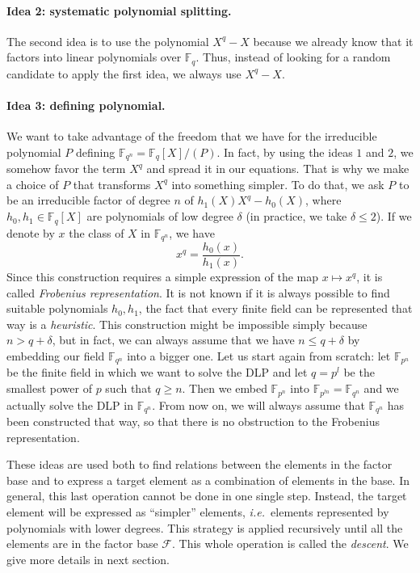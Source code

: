 \documentclass[a4paper,11pt]{article}
\theoremstyle{break}
\theoremstyle{sc}
\theoremstyle{definition}
\theoremstyle{remark}
\newcommand{\ie}{\emph{i.e.\ }}
\begin{document}
\paragraph{Idea 2: systematic polynomial splitting.} The second idea is to use
the polynomial $X^q-X$ because we already know that it factors into linear
polynomials over $\mathbb{F}_q$. Thus, instead of looking for a random candidate to
apply the first idea, we always use $X^q-X$.

\paragraph{Idea 3: defining polynomial.} We want to take advantage of the
freedom that we
have for the irreducible polynomial $P$ defining
$\mathbb{F}_{q^{n}}=\mathbb{F}_{q}[X]/(P)$. In fact, by using the ideas $1$ and
$2$, we somehow favor the term $X^q$ and spread it in our equations. That is why
we make a choice of $P$ that transforms $X^q$ into something simpler. To do
that, we ask $P$ to be an irreducible factor of degree $n$ of
$h_1(X)X^q-h_0(X)$,
where $h_0, h_1\in\mathbb{F}_{q}[X]$ are polynomials of low degree $\delta$
(in practice, we take $\delta\leq2$). If we
denote by $x$ the class of $X$ in $\mathbb{F}_{q^{n}}$, we have
\[
  x^q=\frac{h_0(x)}{h_1(x)}.
\]
Since this construction requires a simple expression of the map $x\mapsto x^q$, it
is called \emph{Frobenius representation}. It is not known if it is always
possible to find suitable polynomials $h_0, h_1$, the fact that every finite
field can be represented that way is a \emph{heuristic}. This construction
might be impossible simply because $n > q+\delta$, but in fact, we can always
assume that we have $n\leq q+\delta$ by embedding our field
$\mathbb{F}_{q^n}$ into a bigger
one. Let us start again from scratch: let $\mathbb{F}_{p^n}$ be the finite field
in which we want to solve the DLP and let $q=p^l$ be the smallest power of $p$ such
that $q\geq n$. Then we embed $\mathbb{F}_{p^n}$ into
$\mathbb{F}_{p^{ln}}=\mathbb{F}_{q^n}$ and we actually solve the DLP in $\mathbb{F}_{q^n}$. From now
on, we will always assume that $\mathbb{F}_{q^n}$ has been constructed that way,
so that there is no obstruction to the Frobenius representation.

These ideas are used both to find relations between the elements in the factor
base and to express a target element as a combination of elements in the base.
In general, this last operation cannot be done in one single step. Instead, the
target element will be expressed as ``simpler'' elements, \ie elements
represented by polynomials with lower degrees. This strategy is applied
recursively until all the elements are in the factor base $\mathcal F$. This
whole operation is called the \emph{descent}. We give more details in next
section.
\end{document}
